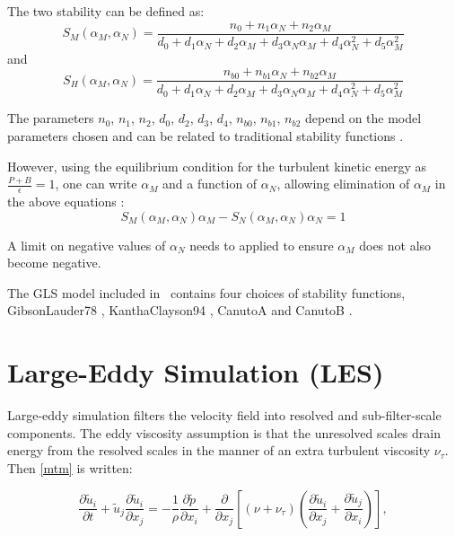 The two stability can be defined as:
\begin{equation*}
S_M(\alpha_M,\alpha_N) = \frac{n_0+n_1\alpha_N+n_2\alpha_M}{d_0+d_1\alpha_N+d_2\alpha_M+d_3\alpha_N\alpha_M+d_4\alpha_N^2+d_5\alpha_M^2}
\end{equation*}
and
\begin{equation*}
S_H(\alpha_M,\alpha_N) = \frac{n_{b0}+n_{b1}\alpha_N+n_{b2}\alpha_M}{d_0+d_1\alpha_N+d_2\alpha_M+d_3\alpha_N\alpha_M+d_4\alpha_N^2+d_5\alpha_M^2}
\end{equation*}

The parameters $n_0$, $n_1$, $n_2$, $d_0$, $d_2$, $d_3$, $d_4$, $n_{b0}$, $n_{b1}$, $n_{b2}$ depend on
the model parameters chosen
and can be related to traditional stability functions \citep{umlauf2005}.

However, using the equilibrium condition for the turbulent kinetic energy as $\frac{P+B}{\epsilon}=1$, one can write
$\alpha_M$ and a function of $\alpha_N$, allowing elimination of $\alpha_M$ in the above equations \citep{umlauf2005}:
\begin{equation*}
S_M(\alpha_M,\alpha_N)\alpha_M - S_N(\alpha_M,\alpha_N)\alpha_N=1
\end{equation*}

A limit on negative values of $\alpha_N$ needs to applied to ensure $\alpha_M$ does not also become negative. 

The GLS model included in \fluidity\ contains four choices of stability functions, GibsonLauder78 \citep{gibson1978}, KanthaClayson94 \citep{kantha1994}, CanutoA and CanutoB \citep{canuto2001}.

\section{Large-Eddy Simulation (LES)}

Large-eddy simulation filters the velocity field into resolved and sub-filter-scale components. The eddy viscosity assumption is that the unresolved scales drain energy from the resolved scales in the manner of an extra turbulent viscosity $\nu_\tau$. Then \eqref{mtm} is written:

\begin{equation}
\frac{\partial \tilde u_i}{\partial t} + \tilde u_j \frac{\partial \tilde u_i}{\partial x_j}
 = -\frac 1 \rho \frac{\partial \tilde p}{\partial x_i}
 + \frac{\partial}{\partial x_j} \left [ (\nu + \nu_\tau) \left ( \frac{\partial \tilde u_i}{\partial x_j} + \frac{\partial \tilde u_j}{\partial x_i} \right ) \right ],
\end{equation}

